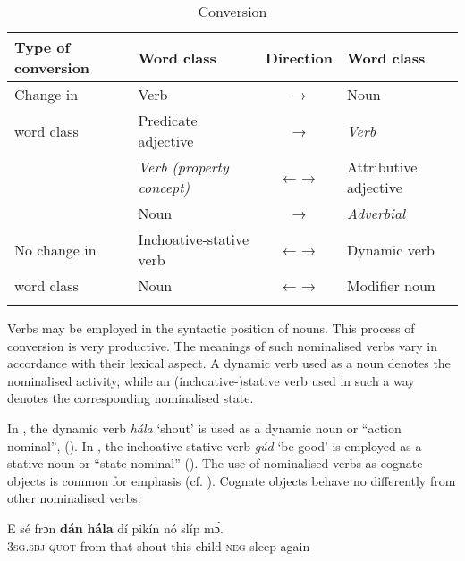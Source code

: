 \begin{table}
\caption{Conversion}
\label{tab:key:4.3}

{\small\begin{tabularx}{\textwidth}{llcl}
\lsptoprule

Type of conversion & Word class & Direction & Word class\\
\midrule
Change in & Verb & \phantom{←  }→ & Noun\\
word class & Predicate adjective & \phantom{←  }→ & \textit{\textup{Verb}}\\
& \textit{\textup{Verb (property concept)}} & ←  → & Attributive adjective\\
& Noun & \phantom{←  }→ & \textit{\textup{Adverbial}}\\

\tablevspace
No change in & Inchoative-stative verb & ←  → & Dynamic verb\\
word class & Noun & ←  → & Modifier noun\\
\lspbottomrule
\end{tabularx}}
\end{table}

Verbs may be employed in the syntactic position of nouns. This process of conversion is very productive. The meanings of such nominalised verbs vary in accordance with their lexical aspect. A dynamic verb used as a noun denotes the nominalised activity, while an (inchoative-)stative verb used in such a way denotes the corresponding nominalised state. 


In , the dynamic verb \textit{hála} ‘shout’ is used as a dynamic noun or “action nominal”, (\citealt{ComrieThompson1985}). In , the inchoative-stative verb \textit{gúd} ‘be good’ is employed as a stative noun or “state nominal” (\citealt{ComrieThompson1985}). The use of nominalised verbs as cognate objects is common for emphasis (cf. ). Cognate objects behave no differently from other nominalised verbs:



\ea%
    \label{ex:key:104}
    \gll E    sé    frɔn    \textbf{dán}    \textbf{hála}    dí  pikín  nó  slíp    mɔ́.\\
\textsc{3sg.sbj}  \textsc{quot}    from  that    shout  this  child  \textsc{neg}  sleep  again\\

